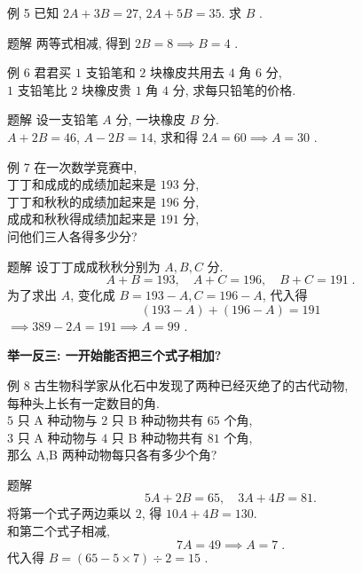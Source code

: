 \documentclass[content.tex]{subfiles}
\begin{document}
\begin{frame}{例 5}
已知 $2A+3B=27$, $2A+5B=35$. 求 $B$ .
\begin{exampleblock}{题解}
两等式相减, 得到 $2B = 8\implies B = 4$ .
\end{exampleblock}
\end{frame}

\begin{frame}{例 6}
君君买 $1$ 支铅笔和 $2$ 块橡皮共用去 $4$ 角 $6$ 分, \\
$1$ 支铅笔比 $2$ 块橡皮贵 $1$ 角 $4$ 分, 求每只铅笔的价格.
\begin{exampleblock}{题解}
设一支铅笔 $A$ 分, 一块橡皮 $B$ 分. \\
$A+2B=46$, $A-2B=14$, 求和得 $2A=60\implies A=30$ .
\end{exampleblock}
\end{frame}

\begin{frame}{例 7}
在一次数学竞赛中, \\
丁丁和成成的成绩加起来是 $193$ 分, \\
丁丁和秋秋的成绩加起来是 $196$ 分, \\
成成和秋秋得成绩加起来是 $191$ 分, \\
问他们三人各得多少分?
\begin{exampleblock}{题解}
设丁丁成成秋秋分别为 $A,B,C$ 分.
$$A+B=193,\quad A+C=196,\quad B+C=191\;.$$
为了求出 $A$, 变化成 $B = 193 - A, C = 196 - A$, 代入得
$$(193-A)+ (196-A)=191$$
$\implies 389-2A=191 \implies A = 99$ .
\end{exampleblock}
\textbf{举一反三: 一开始能否把三个式子相加?}
\end{frame}

\begin{frame}{例 8}
古生物科学家从化石中发现了两种已经灭绝了的古代动物, \\
每种头上长有一定数目的角. \\
$5$ 只 A 种动物与 $2$ 只 B 种动物共有 $65$ 个角, \\
$3$ 只 A 种动物与 $4$ 只 B 种动物共有 $81$ 个角, \\
那么 A,B 两种动物每只各有多少个角? 
\begin{exampleblock}{题解}
$$5A+2B=65,\quad 3A+4B=81.$$
将第一个式子两边乘以 $2$, 得 $10A+4B=130$. \\
和第二个式子相减, 
$$7A=49\implies A=7\;.$$
代入得 $B=(65-5\times7)\div 2=15$ .
\end{exampleblock}
\end{frame}
\end{document}
